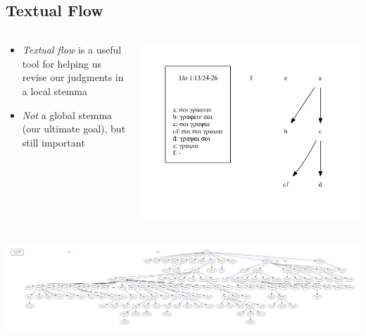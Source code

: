 \documentclass[10pt]{beamer}
\begin{document}
	\subsection{Textual Flow}
	\begin{frame}
		\begin{columns}
			\begin{column}{0.45\textwidth}
				\begin{itemize}
					\item \emph{Textual flow} is a useful tool for helping us revise our judgments in a local stemma
					\item \emph{Not} a global stemma (our ultimate goal), but still important
				\end{itemize}
			\end{column}
			\begin{column}{0.45\textwidth}
				\begin{center}
					\includegraphics[width=\textwidth]{../img/B25K1V13U24-26-local-stemma-incomplete.pdf}
				\end{center}
			\end{column}
		\end{columns}
		\begin{center}
			\includegraphics[width=\textwidth]{../img/B25K1V13U24-26-textual-flow.pdf}
		\end{center}
	\end{frame}
\end{document}
